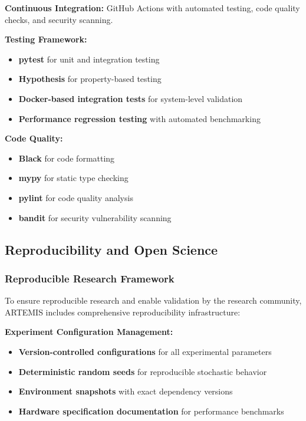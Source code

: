 \documentclass[conference]{IEEEtran}
\begin{document}
\textbf{Continuous Integration:} GitHub Actions with automated testing, code quality checks, and security scanning.

\textbf{Testing Framework:}
\begin{itemize}
    \item \textbf{pytest} for unit and integration testing
    \item \textbf{Hypothesis} for property-based testing
    \item \textbf{Docker-based integration tests} for system-level validation
    \item \textbf{Performance regression testing} with automated benchmarking
\end{itemize}

\textbf{Code Quality:}
\begin{itemize}
    \item \textbf{Black} for code formatting
    \item \textbf{mypy} for static type checking
    \item \textbf{pylint} for code quality analysis
    \item \textbf{bandit} for security vulnerability scanning
\end{itemize}

\subsection{Reproducibility and Open Science}

\subsubsection{Reproducible Research Framework}

To ensure reproducible research and enable validation by the research community, ARTEMIS includes comprehensive reproducibility infrastructure:

\textbf{Experiment Configuration Management:}
\begin{itemize}
    \item \textbf{Version-controlled configurations} for all experimental parameters
    \item \textbf{Deterministic random seeds} for reproducible stochastic behavior
    \item \textbf{Environment snapshots} with exact dependency versions
    \item \textbf{Hardware specification documentation} for performance benchmarks
\end{itemize}
\end{document}
